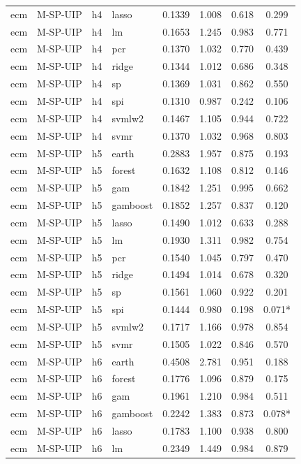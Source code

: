 \begin{ThreePartTable}
\begin{longtable}[t]{llclcccc}
ecm & M-SP-UIP & h4 & lasso & 0.1339 & 1.008 & 0.618 & 0.299\\
ecm & M-SP-UIP & h4 & lm & 0.1653 & 1.245 & 0.983 & 0.771\\
ecm & M-SP-UIP & h4 & pcr & 0.1370 & 1.032 & 0.770 & 0.439\\
ecm & M-SP-UIP & h4 & ridge & 0.1344 & 1.012 & 0.686 & 0.348\\
ecm & M-SP-UIP & h4 & sp & 0.1369 & 1.031 & 0.862 & 0.550\\
ecm & M-SP-UIP & h4 & spi & 0.1310 & 0.987 & 0.242 & 0.106\\
ecm & M-SP-UIP & h4 & svmlw2 & 0.1467 & 1.105 & 0.944 & 0.722\\
ecm & M-SP-UIP & h4 & svmr & 0.1370 & 1.032 & 0.968 & 0.803\\
\addlinespace
ecm & M-SP-UIP & h5 & earth & 0.2883 & 1.957 & 0.875 & 0.193\\
ecm & M-SP-UIP & h5 & forest & 0.1632 & 1.108 & 0.812 & 0.146\\
ecm & M-SP-UIP & h5 & gam & 0.1842 & 1.251 & 0.995 & 0.662\\
ecm & M-SP-UIP & h5 & gamboost & 0.1852 & 1.257 & 0.837 & 0.120\\
ecm & M-SP-UIP & h5 & lasso & 0.1490 & 1.012 & 0.633 & 0.288\\
ecm & M-SP-UIP & h5 & lm & 0.1930 & 1.311 & 0.982 & 0.754\\
ecm & M-SP-UIP & h5 & pcr & 0.1540 & 1.045 & 0.797 & 0.470\\
ecm & M-SP-UIP & h5 & ridge & 0.1494 & 1.014 & 0.678 & 0.320\\
ecm & M-SP-UIP & h5 & sp & 0.1561 & 1.060 & 0.922 & 0.201\\
ecm & M-SP-UIP & h5 & spi & 0.1444 & 0.980 & 0.198 & 0.071*\\
ecm & M-SP-UIP & h5 & svmlw2 & 0.1717 & 1.166 & 0.978 & 0.854\\
ecm & M-SP-UIP & h5 & svmr & 0.1505 & 1.022 & 0.846 & 0.570\\
\addlinespace
ecm & M-SP-UIP & h6 & earth & 0.4508 & 2.781 & 0.951 & 0.188\\
ecm & M-SP-UIP & h6 & forest & 0.1776 & 1.096 & 0.879 & 0.175\\
ecm & M-SP-UIP & h6 & gam & 0.1961 & 1.210 & 0.984 & 0.511\\
ecm & M-SP-UIP & h6 & gamboost & 0.2242 & 1.383 & 0.873 & 0.078*\\
ecm & M-SP-UIP & h6 & lasso & 0.1783 & 1.100 & 0.938 & 0.800\\
ecm & M-SP-UIP & h6 & lm & 0.2349 & 1.449 & 0.984 & 0.879\\

\end{longtable}
\end{ThreePartTable}
